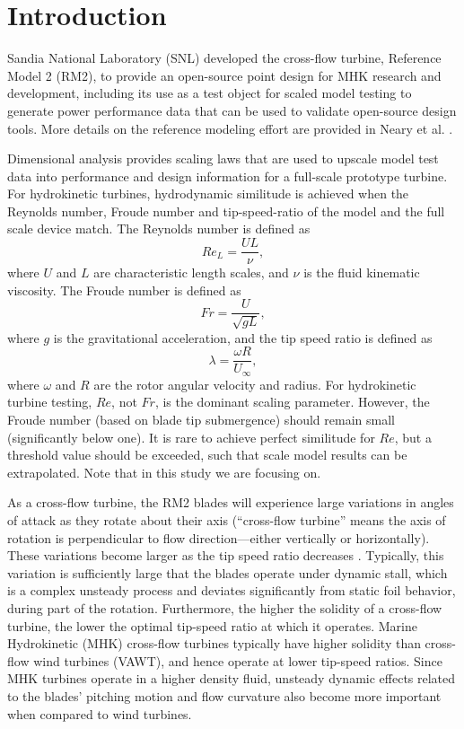 \documentclass[12pt,letterpaper]{scrreprt}
\begin{document}
\tableofcontents

\chapter{Introduction}

Sandia National Laboratory (SNL) developed the cross-flow turbine, Reference
Model 2 (RM2), to provide an open-source point design for MHK research and
development, including its use as a test object for scaled model testing to
generate power performance data that can be used to validate open-source design
tools. More details on the reference modeling effort are provided in Neary et
al. \cite{Neary2014}.

Dimensional analysis provides scaling laws that are used to upscale model test
data into performance and design information for a full-scale prototype turbine.
For hydrokinetic turbines, hydrodynamic similitude is achieved when the Reynolds
number, Froude number and tip-speed-ratio of the model and the full scale device
match. The Reynolds number is defined as
\begin{equation}
Re_L = \frac{UL}{\nu},
\label{eq-Re}
\end{equation}
where $U$ and $L$ are characteristic length scales, and $\nu$ is the fluid
kinematic viscosity. The Froude number is defined as
\begin{equation}
Fr = \frac{U}{\sqrt{gL}},
\label{eq-Fr}
\end{equation}
where $g$ is the gravitational acceleration, and the tip speed ratio is defined
as
\begin{equation}
\lambda=\frac{\omega R}{U_\infty},
\end{equation}
where $\omega$ and $R$ are the rotor angular velocity and radius.
For hydrokinetic turbine testing, $Re$, not $Fr$, is the dominant scaling
parameter. However, the Froude number (based on blade tip submergence) should
remain small (significantly below one). It is rare to achieve perfect similitude
for $Re$, but a threshold value should be exceeded, such that scale model
results can be extrapolated. Note that in this study we are focusing on.

As a cross-flow turbine, the RM2 blades will experience large variations in
angles of attack as they rotate about their axis (``cross-flow turbine'' means
the axis of rotation is perpendicular to flow direction---either vertically or
horizontally). These variations become larger as the tip speed ratio decreases
\cite{Para2002}. Typically, this variation is sufficiently large that the blades
operate under dynamic stall, which is a complex unsteady process and deviates
significantly from static foil behavior, during part of the rotation.
Furthermore, the higher the solidity of a cross-flow turbine, the lower the
optimal tip-speed ratio at which it operates. Marine Hydrokinetic (MHK)
cross-flow turbines typically have higher solidity than cross-flow wind turbines
(VAWT), and hence operate at lower tip-speed ratios. Since MHK turbines operate
in a higher density fluid, unsteady dynamic effects related to the blades'
pitching motion and flow curvature also become more important when compared to
wind turbines.
\end{document}
